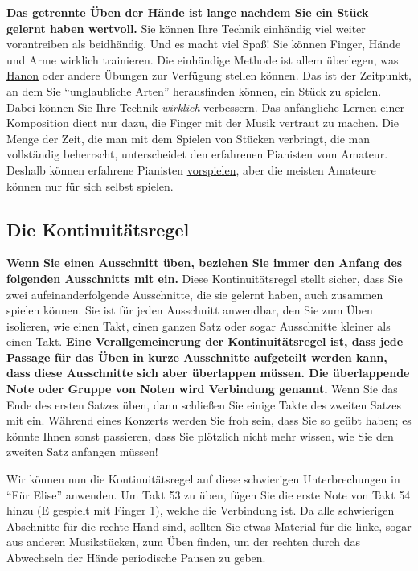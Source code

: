 \textbf{Das getrennte Üben der Hände ist lange nachdem Sie ein Stück gelernt haben wertvoll.}
Sie können Ihre Technik einhändig viel weiter vorantreiben als beidhändig.
Und es macht viel Spaß!
Sie können Finger, Hände und Arme wirklich trainieren.
Die einhändige Methode ist allem überlegen, was \hyperref[c1iii7h]{Hanon} oder andere Übungen zur Verfügung stellen können.
Das ist der Zeitpunkt, an dem Sie \enquote{unglaubliche Arten} herausfinden können, ein Stück zu spielen.
Dabei können Sie Ihre Technik \textit{wirklich} verbessern.
Das anfängliche Lernen einer Komposition dient nur dazu, die Finger mit der Musik vertraut zu machen.
Die Menge der Zeit, die man mit dem Spielen von Stücken verbringt, die man vollständig beherrscht, unterscheidet den erfahrenen Pianisten vom Amateur.
Deshalb können erfahrene Pianisten \hyperref[c1iii14]{vorspielen}, aber die meisten Amateure können nur für sich selbst spielen.


\subsection{Die Kontinuitätsregel}
\label{c1ii8}

\textbf{Wenn Sie einen Ausschnitt üben, beziehen Sie immer den Anfang des folgenden Ausschnitts mit ein.}
Diese Kontinuitätsregel stellt sicher, dass Sie zwei aufeinanderfolgende Ausschnitte, die sie gelernt haben, auch zusammen spielen können.
Sie ist für jeden Ausschnitt anwendbar, den Sie zum Üben isolieren, wie einen Takt, einen ganzen Satz oder sogar Ausschnitte kleiner als einen Takt.
\textbf{Eine Verallgemeinerung der Kontinuitätsregel ist, dass jede Passage für das Üben in kurze Ausschnitte aufgeteilt werden kann, dass diese Ausschnitte sich aber überlappen müssen.
Die überlappende Note oder Gruppe von Noten wird Verbindung genannt.}
Wenn Sie das Ende des ersten Satzes üben, dann schließen Sie einige Takte des zweiten Satzes mit ein.
Während eines Konzerts werden Sie froh sein, dass Sie so geübt haben; es könnte Ihnen sonst passieren, dass Sie plötzlich nicht mehr wissen, wie Sie den zweiten Satz anfangen müssen!

Wir können nun die Kontinuitätsregel auf diese schwierigen Unterbrechungen in \enquote{Für Elise} anwenden.
Um Takt 53 zu üben, fügen Sie die erste Note von Takt 54 hinzu (E gespielt mit Finger 1), welche die Verbindung ist.
Da alle schwierigen Abschnitte für die rechte Hand sind, sollten Sie etwas Material für die linke, sogar aus anderen Musikstücken, zum Üben finden, um der rechten durch das Abwechseln der Hände periodische Pausen zu geben.



